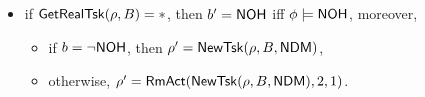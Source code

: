 {\begin{itemize}
\begin{itemize}
\begin{itemize}
\begin{itemize}
        			\end{itemize}
	\end{itemize}
        \item if $\mathsf{GetRealTsk}(\rho,B) = *$, then  $b' = {\sf NOH}$ iff $\phi \models {\sf NOH}$, moreover,
        \begin{itemize}
        		\item if $b = \neg {\sf NOH}$, then $\rho'=\mathsf{NewTsk}(\rho, B, {\sf NDM})$, 
		\item otherwise, $\rho'=\mathsf{RmAct}(\mathsf{NewTsk}(\rho, B, {\sf NDM}), 2, 1)$.
        \end{itemize}
    \end{itemize}
\end{itemize}    

\smallskip
\noindent \fbox{$\phi \models \ntkflag \wedge \neg \ndmflag$}

}
